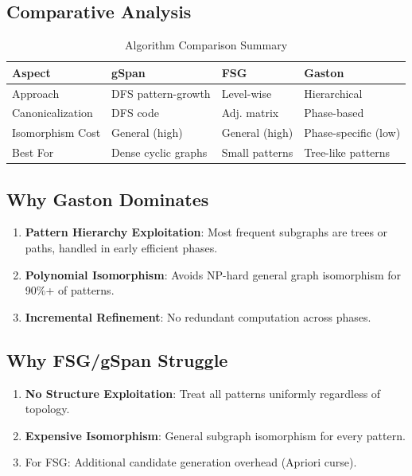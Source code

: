 \documentclass[11pt,a4paper]{article}
\begin{document}
\subsection{Comparative Analysis}

\begin{table}[H]
\centering
\begin{tabular}{llll}
\toprule
\textbf{Aspect} & \textbf{gSpan} & \textbf{FSG} & \textbf{Gaston} \\
\midrule
Approach & DFS pattern-growth & Level-wise & Hierarchical \\
Canonicalization & DFS code & Adj. matrix & Phase-based \\
Isomorphism Cost & General (high) & General (high) & Phase-specific (low) \\
Best For & Dense cyclic graphs & Small patterns & Tree-like patterns \\
\bottomrule
\end{tabular}
\caption{Algorithm Comparison Summary}
\end{table}

\subsection{Why Gaston Dominates}

\begin{enumerate}
    \item \textbf{Pattern Hierarchy Exploitation}: Most frequent subgraphs are trees or paths, handled in early efficient phases.
    \item \textbf{Polynomial Isomorphism}: Avoids NP-hard general graph isomorphism for 90\%+ of patterns.
    \item \textbf{Incremental Refinement}: No redundant computation across phases.
\end{enumerate}

\subsection{Why FSG/gSpan Struggle}

\begin{enumerate}
    \item \textbf{No Structure Exploitation}: Treat all patterns uniformly regardless of topology.
    \item \textbf{Expensive Isomorphism}: General subgraph isomorphism for every pattern.
    \item For FSG: Additional candidate generation overhead (Apriori curse).
\end{enumerate}
\end{document}
